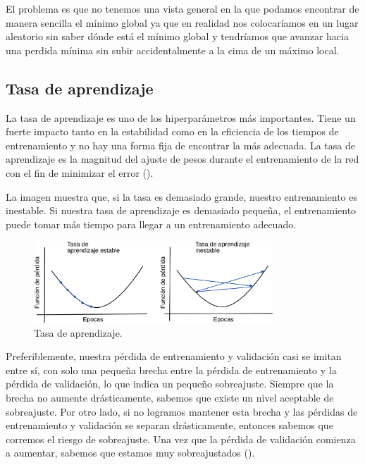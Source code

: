 El problema es que no tenemos una vista general en la que podamos encontrar de manera sencilla el mínimo global ya que en realidad nos colocaríamos en un lugar aleatorio sin saber dónde está el mínimo global y tendríamos que avanzar hacia una perdida mínima sin subir accidentalmente a la cima de un máximo local.

\subsection{Tasa de aprendizaje}

La tasa de aprendizaje es uno de los hiperparámetros más importantes. Tiene un fuerte impacto tanto en la estabilidad como en la eficiencia de los tiempos de entrenamiento y no hay una forma fija de encontrar la más adecuada. La tasa de aprendizaje es la magnitud del ajuste de pesos durante el entrenamiento de la red con el fin de minimizar el error (\cite{valenzuela2020Sistema}).

La imagen muestra que, si la tasa es demasiado grande, nuestro entrenamiento es inestable. Si nuestra tasa de aprendizaje es demasiado pequeña, el entrenamiento puede tomar más tiempo para llegar a un entrenamiento adecuado.

\begin{figure}[H]
    \centering
    \includegraphics[width=0.8\textwidth]{MarcoTeorico/imgs/LearningRate.png}
    \caption{Tasa de aprendizaje.}
    \label{fig:learningRate}
\end{figure}

Preferiblemente, nuestra pérdida de entrenamiento y validación casi se imitan entre sí, con solo una pequeña brecha entre la pérdida de entrenamiento y la pérdida de validación, lo que indica un pequeño sobreajuste. Siempre que la brecha no aumente drásticamente, sabemos que existe un nivel aceptable de sobreajuste. Por otro lado, si no logramos mantener esta brecha y las pérdidas de entrenamiento y validación se separan drásticamente, entonces sabemos que corremos el riesgo de sobreajuste. Una vez que la pérdida de validación comienza a aumentar, sabemos que estamos muy sobreajustados (\cite{rosebrock2017deep}).


